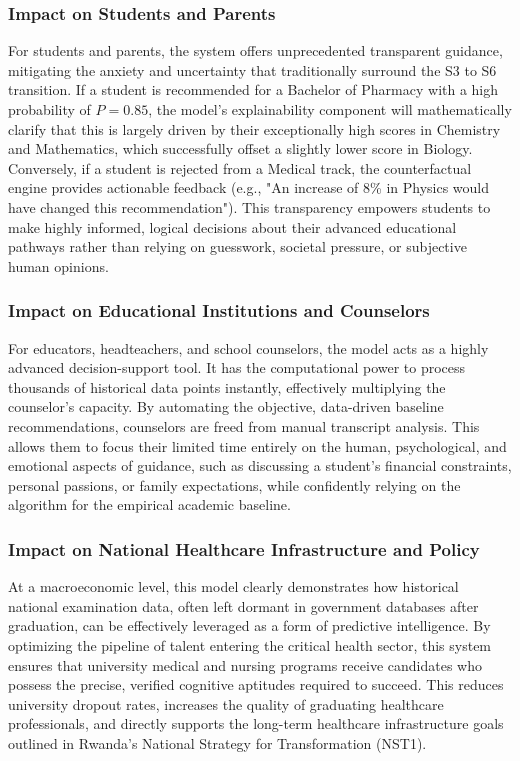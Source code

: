 \subsubsection{Impact on Students and Parents}
For students and parents, the system offers unprecedented transparent guidance, mitigating the anxiety and uncertainty that traditionally surround the S3 to S6 transition. If a student is recommended for a Bachelor of Pharmacy with a high probability of $P = 0.85$, the model's explainability component will mathematically clarify that this is largely driven by their exceptionally high scores in Chemistry and Mathematics, which successfully offset a slightly lower score in Biology. Conversely, if a student is rejected from a Medical track, the counterfactual \parencite{wachter2017counterfactual} engine provides actionable feedback (e.g., "An increase of 8\% in Physics would have changed this recommendation"). This transparency empowers students to make highly informed, logical decisions about their advanced educational pathways rather than relying on guesswork, societal pressure, or subjective human opinions.

\subsubsection{Impact on Educational Institutions and Counselors}
For educators, headteachers, and school counselors, the model acts as a highly advanced decision-support tool. It has the computational power to process thousands of historical data points instantly, effectively multiplying the counselor's capacity. By automating the objective, data-driven baseline recommendations, counselors are freed from manual transcript analysis. This allows them to focus their limited time entirely on the human, psychological, and emotional aspects of guidance, such as discussing a student's financial constraints, personal passions, or family expectations, while confidently relying on the algorithm for the empirical academic baseline.

\subsubsection{Impact on National Healthcare Infrastructure and Policy}
At a macroeconomic level, this model clearly demonstrates how historical national examination data, often left dormant in government databases after graduation, can be effectively leveraged as a form of predictive intelligence. By optimizing the pipeline of talent entering the critical health sector, this system ensures that university medical and nursing programs receive candidates who possess the precise, verified cognitive aptitudes required to succeed. This reduces university dropout rates, increases the quality of graduating healthcare professionals, and directly supports the long-term healthcare infrastructure goals outlined in Rwanda's National Strategy for Transformation (NST1).

